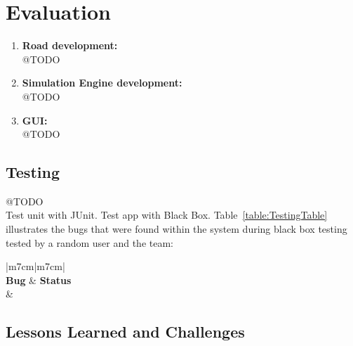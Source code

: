 \documentclass[11pt]{article}
\begin{document}
	
\section{Evaluation} %
\begin{enumerate}
	\item \textbf{Road development:} 
	\\@TODO
	\item \textbf{Simulation Engine development:} 
	\\@TODO
	\item \textbf{GUI:} 
	\\@TODO
\end{enumerate}

\subsection{Testing} 
@TODO
\\Test unit with JUnit. Test app with Black Box. 
Table~\ref{table:TestingTable} illustrates the bugs that were found within the system during black box testing tested by a random user and the team:
\begin{center}
	\begin{table}[!htb]
	\begin{tabular}{|m{7cm}|m{7cm}|}
		 \hline
		 \\ 
		\hline 
		 \centering \textbf{Bug} & \textbf{Status}\\\hline
		 &  \\  \hline
		
	\end{tabular}
	\caption{Testing Table}
		\label{table:TestingTable}
	\end{table}
\end{center}

\pagebreak
\subsection{Lessons Learned and Challenges}
\end{document}
